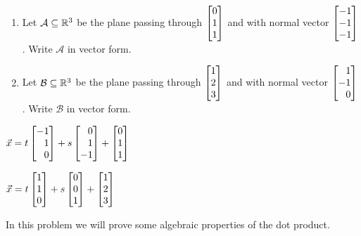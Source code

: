 \begin{exercises}
\begin{problist}
		\prob
		\begin{enumerate}
			\item Let $\mathcal A\subseteq \mathbb{R}^3$ be the plane passing through $\mat{0\\1\\1}$
			and with normal vector $\mat{-1\\-1\\-1}$. Write $\mathcal A$ in vector form.
			\item Let $\mathcal B\subseteq \mathbb{R}^3$ be the plane passing through $\mat{1\\2\\3}$
			and with normal vector $\mat{1\\-1\\0}$. Write $\mathcal B$ in vector form.
		\end{enumerate}
		\begin{solution}
			\begin{enumerate*} 
				\item $\vec x = t\mat{-1\\1\\0}+s\mat{0\\1\\-1} + \mat{0\\1\\1}$
				\item $\vec x = t\mat{1\\1\\0}+s\mat{0\\0\\1}+\mat{1\\2\\3}$ 
			\end{enumerate*}
		\end{solution}
		
		\prob In this problem we will prove some algebraic properties of the dot product.
		\begin{enumerate}
			

\end{enumerate}
\end{problist}
\end{exercises}
